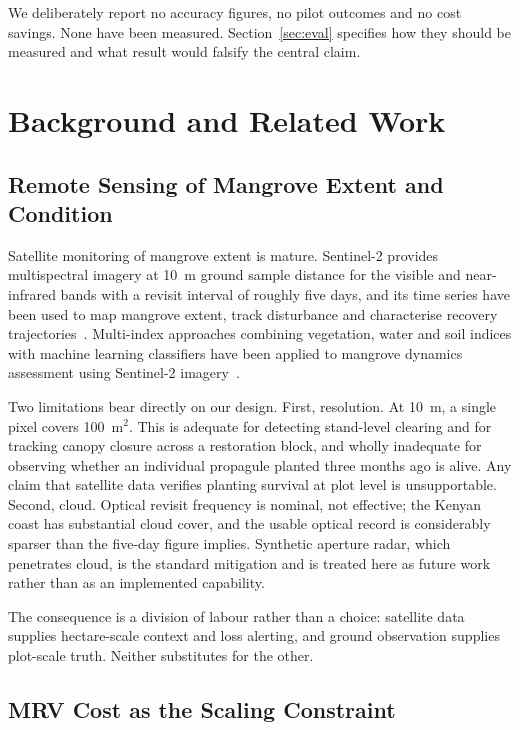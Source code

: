 \documentclass[10pt,twocolumn,a4paper]{article}
\begin{document}
We deliberately report no accuracy figures, no pilot outcomes and no cost
savings. None have been measured. Section~\ref{sec:eval} specifies how they
should be measured and what result would falsify the central claim.

\section{Background and Related Work}

\subsection{Remote Sensing of Mangrove Extent and Condition}

Satellite monitoring of mangrove extent is mature. Sentinel-2 provides
multispectral imagery at 10~m ground sample distance for the visible and
near-infrared bands with a revisit interval of roughly five days, and its time
series have been used to map mangrove extent, track disturbance and characterise
recovery trajectories~\cite{s2monitoring,rsreview}. Multi-index approaches
combining vegetation, water and soil indices with machine learning classifiers
have been applied to mangrove dynamics assessment using Sentinel-2
imagery~\cite{multiindex}.

Two limitations bear directly on our design. First, resolution. At 10~m, a
single pixel covers 100~m$^2$. This is adequate for detecting stand-level
clearing and for tracking canopy closure across a restoration block, and wholly
inadequate for observing whether an individual propagule planted three months
ago is alive. Any claim that satellite data verifies planting survival at plot
level is unsupportable. Second, cloud. Optical revisit frequency is nominal, not
effective; the Kenyan coast has substantial cloud cover, and the usable optical
record is considerably sparser than the five-day figure implies. Synthetic
aperture radar, which penetrates cloud, is the standard mitigation and is
treated here as future work rather than as an implemented capability.

The consequence is a division of labour rather than a choice: satellite data
supplies hectare-scale context and loss alerting, and ground observation
supplies plot-scale truth. Neither substitutes for the other.

\subsection{MRV Cost as the Scaling Constraint}
\end{document}
